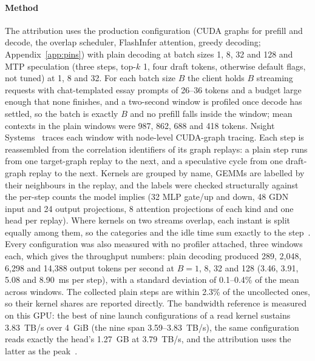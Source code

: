 \paragraph{Method} The attribution uses the production configuration (CUDA graphs for prefill and decode, the overlap scheduler, FlashInfer attention, greedy decoding; Appendix~\ref{app:pins}) with plain decoding at batch sizes 1, 8, 32 and 128 and MTP speculation (three steps, top-$k$ 1, four draft tokens, otherwise default flags, not tuned) at 1, 8 and 32. For each batch size $B$ the client holds $B$ streaming requests with chat-templated essay prompts of 26--36 tokens and a budget large enough that none finishes, and a two-second window is profiled once decode has settled, so the batch is exactly $B$ and no prefill falls inside the window; mean contexts in the plain windows were 987, 862, 688 and 418 tokens. Nsight Systems~\cite{nsys} traces each window with node-level CUDA-graph tracing. Each step is reassembled from the correlation identifiers of its graph replays: a plain step runs from one target-graph replay to the next, and a speculative cycle from one draft-graph replay to the next. Kernels are grouped by name, GEMMs are labelled by their neighbours in the replay, and the labels were checked structurally against the per-step counts the model implies (32 MLP gate/up and down, 48 GDN input and 24 output projections, 8 attention projections of each kind and one head per replay). Where kernels on two streams overlap, each instant is split equally among them, so the categories and the idle time sum exactly to the step~. Every configuration was also measured with no profiler attached, three windows each, which gives the throughput numbers: plain decoding produced 289, 2,048, 6,298 and 14,388 output tokens per second at $B=1$, 8, 32 and 128 (3.46, 3.91, 5.08 and 8.90~ms per step), with a standard deviation of 0.1--0.4\% of the mean across windows. The collected plain steps are within 2.3\% of the uncollected ones, so their kernel shares are reported directly. The bandwidth reference is measured on this GPU: the best of nine launch configurations of a read kernel sustains 3.83~TB/s over 4~GiB (the nine span 3.59--3.83~TB/s), the same configuration reads exactly the head's 1.27~GB at 3.79~TB/s, and the attribution uses the latter as the peak~.

